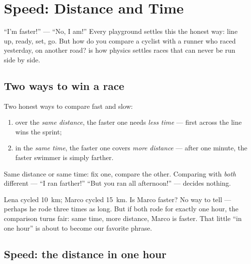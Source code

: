 \chapter{Speed: Distance and Time}\label{ch:g5:speed-distance-time}

``I'm faster!'' --- ``No, I am!'' Every playground settles this the
honest way: line up, ready, set, go. But how do you compare a
cyclist with a runner who raced yesterday, on another road? 
is how physics settles races that can never be run side by side.

\section{Two ways to win a race}

\begin{proposition}\label{prop:g5:speed-distance-time:rules}
Two honest ways to compare fast and slow:
\begin{enumerate}
  \item over the \emph{same distance}, the faster one needs
        \emph{less time} --- first across the line wins the sprint;
  \item in the \emph{same time}, the faster one covers \emph{more
        distance} --- after one minute, the faster swimmer is
        simply farther.
\end{enumerate}
Same distance or same time: fix one, compare the other. Comparing
with \emph{both} different --- ``I ran farther!'' ``But you ran all
afternoon!'' --- decides nothing.
\end{proposition}

\begin{example}\label{ex:g5:speed-distance-time:fair}
Lena cycled \qty{10}{km}; Marco cycled \qty{15}{km}. Is Marco
faster? No way to tell --- perhaps he rode three times as long.
But if both rode for exactly one hour, the comparison turns fair:
same time, more distance, Marco is faster. That little ``in one
hour'' is about to become our favorite phrase.
\end{example}

\section{Speed: the distance in one hour}


